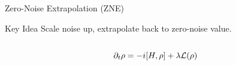 \documentclass[11pt,aspectratio=1610,xcolor=dvipsnames]{beamer}
\begin{document}
\begin{frame}{Zero-Noise Extrapolation (ZNE)}

	\begin{exampleblock}{Key Idea}
		Scale noise up, extrapolate back to zero-noise value.
	\end{exampleblock}

	\begin{columns}
		\begin{column}{0.4\textwidth}
			\begin{equation*}
				\partial_t \rho = - i \comm{H}{\rho} + \lambda \mathcal{L}(\rho)
			\end{equation*}

			\begin{center}
			\end{center}
		\end{column}


\end{columns}
\end{frame}
\end{document}
